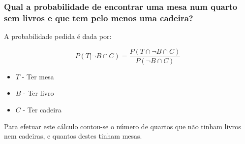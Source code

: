 \subsubsection{Qual a probabilidade de encontrar uma mesa num quarto sem livros e que tem pelo menos uma cadeira?}
\label{chap2:subsec:q8}

A probabilidade pedida é dada por: \cite{slides}

\begin{equation}
  P(T | \neg B \cap C) = \frac{P(T \cap \neg B \cap C)}{P(\neg B \cap C)}
\end{equation}

\begin{itemize}
    \item $T$ - Ter mesa
    \item $B$ - Ter livro
    \item $C$ - Ter cadeira
\end{itemize}

Para efetuar este cálculo contou-se o número de quartos que não tinham livros nem cadeiras, e quantos destes tinham mesas.
